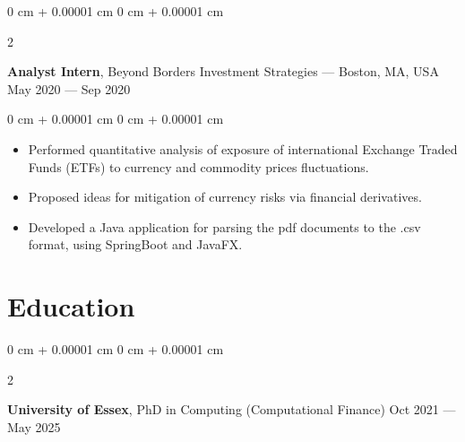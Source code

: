 \documentclass[10pt, letterpaper]{article}
\newenvironment{highlights}{
    \begin{itemize}[
        topsep=0.10 cm,
        parsep=0.10 cm,
        partopsep=0pt,
        itemsep=0pt,
        leftmargin=0 cm + 10pt
    ]
}{
    \end{itemize}
} %
\newenvironment{onecolentry}{
    \begin{adjustwidth}{
        0 cm + 0.00001 cm
    }{
        0 cm + 0.00001 cm
    }
}{
    \end{adjustwidth}
} %
\newenvironment{twocolentry}[2][]{
    \onecolentry
    \def\secondColumn{#2}
    \setcolumnwidth{\fill, 4.5 cm}
    \begin{paracol}{2}
}{
    \switchcolumn \raggedleft \secondColumn
    \end{paracol}
    \endonecolentry
} %
\begin{document}
        \vspace{0.2 cm}

        \begin{twocolentry}{
            May 2020 --- Sep 2020
        }
            \textbf{Analyst Intern}, Beyond Borders Investment Strategies --- Boston, MA, USA\end{twocolentry}

            \vspace{0.10 cm}
            \begin{onecolentry}
                \begin{highlights}
                \item Performed quantitative analysis of exposure of international Exchange Traded Funds (ETFs) to currency and commodity prices fluctuations.
                \item Proposed ideas for mitigation of currency risks via financial derivatives.
                \item Developed a Java application for parsing the pdf documents to the .csv format, using SpringBoot and JavaFX.
                \end{highlights}
            \end{onecolentry}


    \section{Education}

        \begin{twocolentry}{
            Oct 2021 --- May 2025
        }
        \textbf{University of Essex}, PhD in Computing (Computational Finance)\end{twocolentry}
\end{document}
